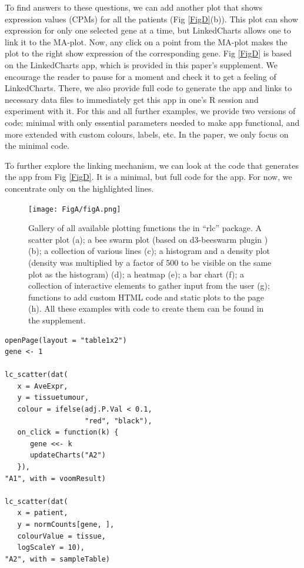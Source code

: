 \documentclass[twocolumn,10pt]{article}
\begin{document}
To find answers to these questions, we can add another plot that shows expression values (CPMs) for all the patients (Fig \ref{FigD}(b)). This plot can show expression for only one selected gene at a time, but LinkedCharts allows one to link it to the MA-plot. Now, any click on a point from the MA-plot makes the plot to the right show expression of the corresponding gene. Fig \ref{FigD} is based on the LinkedCharts app, which is provided in this paper's supplement. We encourage the reader to pause for a moment and check it to get a feeling of LinkedCharts. There, we also provide full code to generate the app and links to necessary data files to immediately get this app in one's R session and experiment with it. For this and all further examples, we provide two versions of code: minimal with only essential parameters needed to make app functional, and more extended with custom colours, labels, etc. In the paper, we only focus on the minimal code.

To further explore the linking mechanism, we can look at the code that generates the app from Fig \ref{FigD}. It is a minimal, but full code for the app. For now, we concentrate only on the highlighted lines.

\begin{figure}[b]
	\texttt{[image: FigA/figA.png]}
	\caption{Gallery of all available plotting functions the in ``rlc'' package. A scatter plot (a); a bee swarm plot (based on d3-beeswarm plugin \citep{lebeau_2017}) (b); a collection of various lines (c); a histogram and a density plot (density was multiplied by a factor of 500 to be visible on the same plot as the histogram) (d); a heatmap (e); a bar chart (f); a collection of interactive elements to gather input from the user (g); functions to add custom HTML code and static plots to the page (h). All these examples with code to create them can be found in the supplement.}
	\label{FigA}
\end{figure}

\begin{verbatim}
openPage(layout = "table1x2")
gene <- 1

lc_scatter(dat(
   x = AveExpr,
   y = tissuetumour,
   colour = ifelse(adj.P.Val < 0.1, 
                   "red", "black"),
   on_click = function(k) {
      gene <<- k
      updateCharts("A2")
   }),
"A1", with = voomResult)

lc_scatter(dat(
   x = patient,
   y = normCounts[gene, ],
   colourValue = tissue, 
   logScaleY = 10),
"A2", with = sampleTable)
\end{verbatim}
\end{document}
